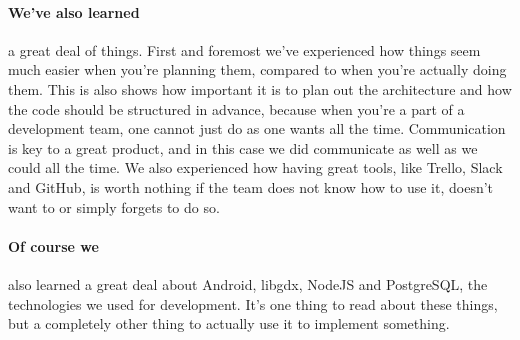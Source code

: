 \paragraph{We've also learned} a great deal of things. First and foremost we've experienced how things seem much easier when you're planning them, compared to when you're actually doing them. This is also shows how important it is to plan out the architecture and how the code should be structured in advance, because when you're a part of a development team, one cannot just do as one wants all the time. Communication is key to a great product, and in this case we did communicate as well as we could all the time. We also experienced how having great tools, like Trello, Slack and GitHub, is worth nothing if the team does not know how to use it, doesn't want to or simply forgets to do so.

\paragraph{Of course we} also learned a great deal about Android, libgdx, NodeJS and PostgreSQL, the technologies we used for development. It's one thing to read about these things, but a completely other thing to actually use it to implement something.